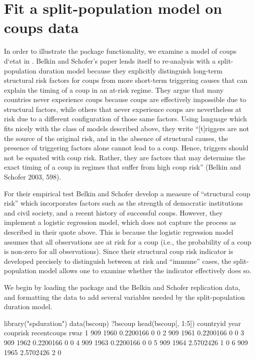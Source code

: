 \section{Fit a split-population model on coups
data}

In order to illustrate the package functionality, we examine a model of
coups d`etat in \citet{belkin2003toward}. Belkin and Schofer's paper
lends itself to re-analysis with a split-population duration model
because they explicitly distinguish long-term structural risk factors
for coups from more short-term triggering causes that can explain the
timing of a coup in an at-risk regime. They argue that many countries
never experience coups because coups are effectively impossible due to
structural factors, while others that never experience coups are
nevertheless at risk due to a different configuration of those same
factors. Using language which fits nicely with the class of models
described above, they write ``{[}t{]}riggers are not the source of the
original risk, and in the absence of structural causes, the presence of
triggering factors alone cannot lead to a coup. Hence, triggers should
not be equated with coup risk. Rather, they are factors that may
determine the exact timing of a coup in regimes that suffer from high
coup risk'' (Belkin and Schofer 2003, 598).

For their empirical test Belkin and Schofer develop a measure of
``structural coup risk'' which incorporates factors such as the strength
of democratic institutions and civil society, and a recent history of
successful coups. However, they implement a logistic regression model,
which does not capture the process as described in their quote above.
This is because the logistic regression model assumes that all
observations are at risk for a coup (i.e., the probability of a coup is
non-zero for all observations). Since their structural coup risk
indicator is developed precisely to distinguish between at risk and
``immune'' cases, the split-population model allows one to examine
whether the indicator effectively does so.

We begin by loading the package and the Belkin and Schofer replication
data, and formatting the data to add several variables needed by the
split-population duration model.

\begin{example}
  library("spduration")
  data(bscoup)
  ?bscoup
  head(bscoup[, 1:5])
    countryid  year  couprisk recentcoups rwar
  1       909  1960 0.2200166           0    0
  2       909  1961 0.2200166           0    0
  3       909  1962 0.2200166           0    0
  4       909  1963 0.2200166           0    0
  5       909  1964 2.5702426           1    0
  6       909  1965 2.5702426           2    0
\end{example}

